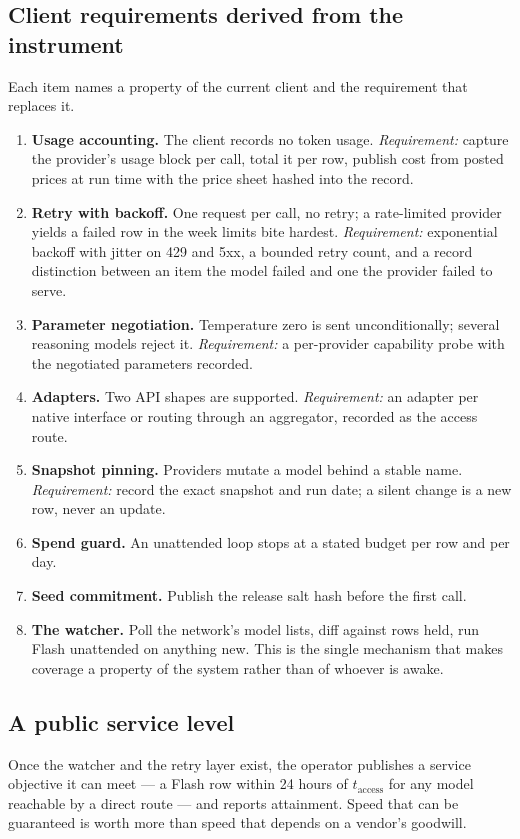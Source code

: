 \documentclass[11pt]{article}
\theoremstyle{definition}
\begin{document}
\subsection{Client requirements derived from the instrument}
Each item names a property of the current client and the requirement that replaces it.
\begin{enumerate}[leftmargin=1.6em,itemsep=1pt]
\item \textbf{Usage accounting.} The client records no token usage. \emph{Requirement:} capture the provider's usage block per call, total it per row, publish cost from posted prices at run time with the price sheet hashed into the record.
\item \textbf{Retry with backoff.} One request per call, no retry; a rate-limited provider yields a failed row in the week limits bite hardest. \emph{Requirement:} exponential backoff with jitter on 429 and 5xx, a bounded retry count, and a record distinction between an item the model failed and one the provider failed to serve.
\item \textbf{Parameter negotiation.} Temperature zero is sent unconditionally; several reasoning models reject it. \emph{Requirement:} a per-provider capability probe with the negotiated parameters recorded.
\item \textbf{Adapters.} Two API shapes are supported. \emph{Requirement:} an adapter per native interface or routing through an aggregator, recorded as the access route.
\item \textbf{Snapshot pinning.} Providers mutate a model behind a stable name. \emph{Requirement:} record the exact snapshot and run date; a silent change is a new row, never an update.
\item \textbf{Spend guard.} An unattended loop stops at a stated budget per row and per day.
\item \textbf{Seed commitment.} Publish the release salt hash before the first call.
\item \textbf{The watcher.} Poll the network's model lists, diff against rows held, run Flash unattended on anything new. This is the single mechanism that makes coverage a property of the system rather than of whoever is awake.
\end{enumerate}

\subsection{A public service level}
Once the watcher and the retry layer exist, the operator publishes a service objective it can meet --- a Flash row within 24 hours of $t_{\text{access}}$ for any model reachable by a direct route --- and reports attainment. Speed that can be guaranteed is worth more than speed that depends on a vendor's goodwill.
\end{document}
